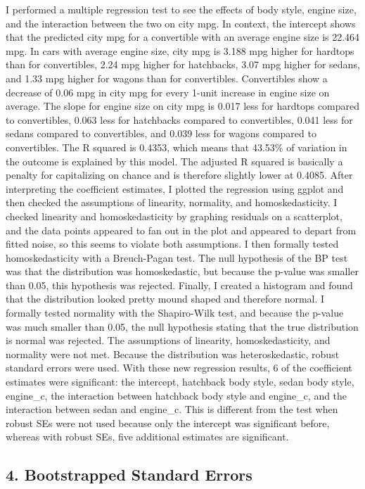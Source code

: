\documentclass[]{article}
\begin{document}
I performed a multiple regression test to see the effects of body style,
engine size, and the interaction between the two on city mpg. In
context, the intercept shows that the predicted city mpg for a
convertible with an average engine size is 22.464 mpg. In cars with
average engine size, city mpg is 3.188 mpg higher for hardtops than for
convertibles, 2.24 mpg higher for hatchbacks, 3.07 mpg higher for
sedans, and 1.33 mpg higher for wagons than for convertibles.
Convertibles show a decrease of 0.06 mpg in city mpg for every 1-unit
increase in engine size on average. The slope for engine size on city
mpg is 0.017 less for hardtops compared to convertibles, 0.063 less for
hatchbacks compared to convertibles, 0.041 less for sedans compared to
convertibles, and 0.039 less for wagons compared to convertibles. The R
squared is 0.4353, which means that 43.53\% of variation in the outcome
is explained by this model. The adjusted R squared is basically a
penalty for capitalizing on chance and is therefore slightly lower at
0.4085. After interpreting the coefficient estimates, I plotted the
regression using ggplot and then checked the assumptions of linearity,
normality, and homoskedasticity. I checked linearity and
homoskedasticity by graphing residuals on a scatterplot, and the data
points appeared to fan out in the plot and appeared to depart from
fitted noise, so this seems to violate both assumptions. I then formally
tested homoskedasticity with a Breuch-Pagan test. The null hypothesis of
the BP test was that the distribution was homoskedastic, but because the
p-value was smaller than 0.05, this hypothesis was rejected. Finally, I
created a histogram and found that the distribution looked pretty mound
shaped and therefore normal. I formally tested normality with the
Shapiro-Wilk test, and because the p-value was much smaller than 0.05,
the null hypothesis stating that the true distribution is normal was
rejected. The assumptions of linearity, homoskedasticity, and normality
were not met. Because the distribution was heteroskedastic, robust
standard errors were used. With these new regression results, 6 of the
coefficient estimates were significant: the intercept, hatchback body
style, sedan body style, engine\_c, the interaction between hatchback
body style and engine\_c, and the interaction between sedan and
engine\_c. This is different from the test when robust SEs were not used
because only the intercept was significant before, whereas with robust
SEs, five additional estimates are significant.

\subsection{4. Bootstrapped Standard
Errors}\label{bootstrapped-standard-errors}
\end{document}
